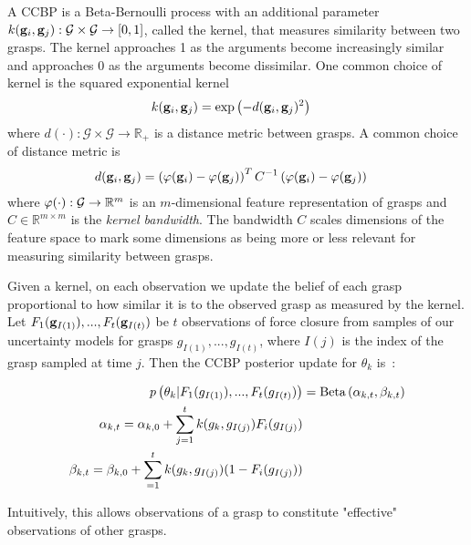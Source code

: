 A CCBP is a Beta-Bernoulli process with an additional parameter $k(\mathbf{g}_i, \mathbf{g}_j) : \mathcal{G} \times \mathcal{G} \rightarrow [0,1]$, called the kernel, that measures similarity between two grasps.
The kernel approaches 1 as the arguments become increasingly similar and approaches 0 as the arguments become dissimilar.
One common choice of kernel is the squared exponential kernel 
\begin{align*}
	k(\mathbf{g}_i, \mathbf{g}_j) &= \exp\left( -d(\mathbf{g}_i, \mathbf{g}_j)^2 \right)
\end{align*}
\noindent where $d(\cdot): \mathcal{G} \times \mathcal{G} \rightarrow \mathbb{R}_{+}$ is a distance metric between grasps.
A common choice of distance metric is
\begin{align*}
	d(\mathbf{g}_i, \mathbf{g}_j) &= \left( \varphi(\mathbf{g}_i) - \varphi(\mathbf{g}_j) \right)^T C^{-1} \left( \varphi(\mathbf{g}_i) - \varphi(\mathbf{g}_j)\right)
\end{align*}
\noindent where $\varphi(\cdot) : \mathcal{G} \rightarrow \mathbb{R}^m$ is an $m$-dimensional feature representation of grasps and $C \in \mathbb{R}^{m \times m}$ is the {\it kernel bandwidth}.
The bandwidth $C$ scales dimensions of the feature space to mark some dimensions as being more or less relevant for measuring similarity between grasps.

Given a kernel, on each observation we update the belief of each grasp proportional to how similar it is to the observed grasp as measured by the kernel. 
Let $F_{1}(\mathbf{g}_{I(1)}), ..., F_{t}(\mathbf{g}_{I(t)})$ be $t$ observations of force closure from samples of our uncertainty models for grasps $g_{I(1)}, ..., g_{I(t)}$, where $I(j)$ is the index of the grasp sampled at time $j$.
Then the CCBP posterior update for $\theta_k$ is~\cite{}:

\vspace{-2ex}
\begin{align*}
	p \left(\theta_k | F_{1}(g_{I(1)}), ..., F_{t}(g_{I(t)}) \right) &= \text{Beta}\left( \alpha_{k,t}, \beta_{k,t} \right) \\
	\alpha_{k,t} = \alpha_{k,0} + \sum \limits_{j=1}^t k(g_k, g_{I(j)}) F_{i}(g_{I(j)}) \\
	\beta_{k,t} = \beta_{k,0} + \sum \limits_{=1}^t k(g_k, g_{I(j)}) (1 - F_{i}(g_{I(j)}))
\end{align*}

\noindent Intuitively, this allows observations of a grasp to constitute "effective" observations of other grasps.

